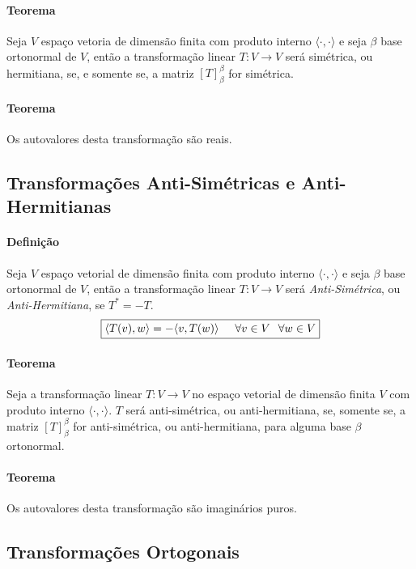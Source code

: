 \documentclass{article}
\begin{document}
            \paragraph{Teorema}Seja $V$ espaço vetoria de dimensão finita com produto interno $\langle\cdot,\cdot\rangle$ e seja $\beta$ base ortonormal de $V$, então a transformação linear $T: V \rightarrow V$ será simétrica, ou hermitiana, se, e somente se, a matriz $[T]_{\beta}^{\beta}$ for simétrica.

            \paragraph{Teorema}Os autovalores desta transformação são reais.

        \subsection{Transformações Anti-Simétricas e Anti-Hermitianas}
            \paragraph{Definição}Seja $V$ espaço vetorial de dimensão finita com produto interno $\langle\cdot,\cdot\rangle$ e seja $\beta$ base ortonormal de $V$, então a transformação linear $T: V \rightarrow V$ será \textit{Anti-Simétrica}, ou \textit{Anti-Hermitiana}, se $T^{*} = - T$.
                \[\boxed{\langle T(v), w \rangle = - \langle v, T(w) \rangle \hspace{5mm} \forall v\in V \hspace{2.5mm} \forall w\in V}\]

            \paragraph{Teorema}Seja a transformação linear $T: V \rightarrow V$ no espaço vetorial de dimensão finita $V$ com produto interno $\langle\cdot,\cdot\rangle$. $T$ será anti-simétrica, ou anti-hermitiana, se, somente se, a matriz $[T]_{\beta}^{\beta}$ for anti-simétrica, ou anti-hermitiana, para alguma base $\beta$ ortonormal.

            \paragraph{Teorema}Os autovalores desta transformação são imaginários puros.

        \subsection{Transformações Ortogonais}
\end{document}
